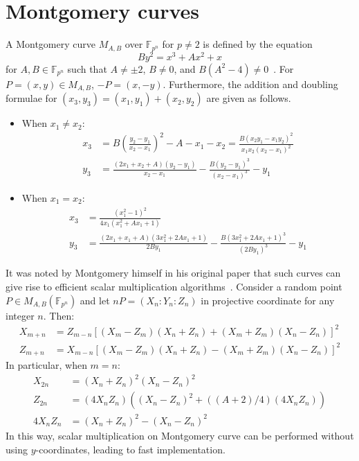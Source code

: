 \documentclass{llncs}
\newcommand{\F}[1]{\ensuremath{\mathbb F_{#1}}}
\begin{document}
\section{Montgomery curves}
\label{sec:montgomery-symmetry}
%
A Montgomery curve $M_{A,B}$ over \F{p^n} for $p\neq 2$ is defined by
the equation \begin{equation}
  By^2=x^3+Ax^2+x \label{eq:montgomery-curve} \end{equation} for
$A,B\in\F{p^n}$ such that $A\neq\pm 2$, $B\neq 0$, and
$B(A^2-4)\neq 0$~\cite{1987-montgomery}.
%
For $P=(x,y)\in M_{A,B}$, $-P=(x,-y)$.
%
Furthermore, the addition and doubling formulae for
$(x_3,y_3)=(x_1,y_1)+(x_2,y_2)$ are given as follows.
%
\begin{itemize}
\item When $x_1\neq x_2$:
  \begin{align*}
    x_3 & = B\left(\frac{y_2 - y_1} {x_2 - x_1}\right)^2 - A - x_1 - x_2 = \frac{B(x_2y_1 - x_1y_2)^2} {x_1x_2(x_2 - x_1)^2} \\
    y_3 & = \frac{(2x_1 + x_2 + A)(y_2 - y_1)} {x_2 - x_1} - \frac{B(y_2 - y_1)^3} {(x_2 - x_1)^3} - y_1
  \end{align*}
\item When $x_1=x_2$:
  \begin{align*}
    x_3 & = \frac{(x_1^2 - 1)^2} {4x_1(x_1^2 + Ax_1 + 1)}  \\
    y_3 & = \frac{(2x_1 + x_1 + A)(3x_1^2 + 2Ax_1 + 1)} {2By_1} - \frac{B(3x_1^2 + 2Ax_1 + 1)^3} {(2By_1)^3} - y_1
  \end{align*}
\end{itemize}
%
It was noted by Montgomery himself in his original paper that such
curves can give rise to efficient scalar multiplication
algorithms~\cite{1987-montgomery}.
%
Consider a random point $P\in M_{A,B}(\F{p^n})$ and let
$nP=(X_n:Y_n:Z_n)$ in projective coordinate for any integer $n$.
%
Then:
%
\begin{align*}
  X_{m+n} & = Z_{m-n}[(X_m - Z_m)(X_n + Z_n) + (X_m + Z_m)(X_n - Z_n)]^2 \\
  Z_{m+n} & = X_{m-n}[(X_m - Z_m)(X_n + Z_n) - (X_m + Z_m)(X_n - Z_n)]^2
\end{align*}
%
In particular, when $m=n$:
\begin{align*}
  X_{2n} & = (X_n + Z_n)^2(X_n - Z_n)^2 \\
  Z_{2n} & = (4X_nZ_n)\left((X_n - Z_n)^2 + ((A+2)/4)(4X_nZ_n)\right) \\
  4X_nZ_n & = ( X_n + Z_n)^2 - (X_n - Z_n)^2
\end{align*}
%
In this way, scalar multiplication on Montgomery curve can be
performed without using $y$-coordinates, leading to fast
implementation.
\end{document}
